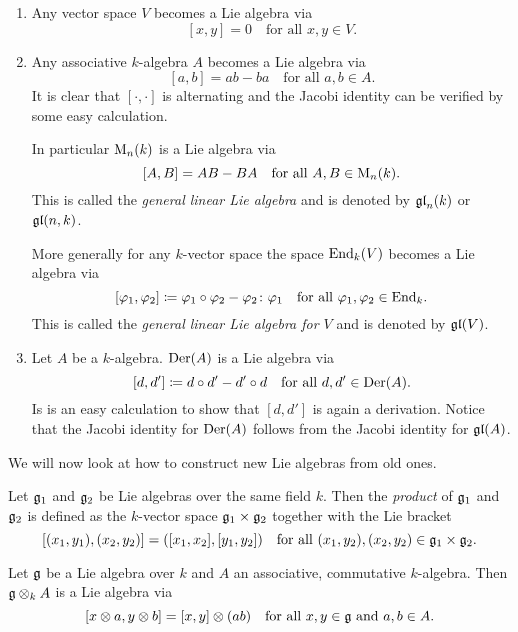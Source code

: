 \begin{expls}
 \begin{enumerate}
  \item
   Any vector space $V$ becomes a Lie algebra via
   \[
    [x,y] = 0 \quad \text{for all $x,y \in V$}.
   \]
  \item
   Any associative $k$-algebra $A$ becomes a Lie algebra via
   \[
    [a,b] = ab-ba \quad \text{for all $a,b \in A$}.
   \]
   It is clear that $[\cdot, \cdot]$ is alternating and the Jacobi identity can be verified by some easy calculation.
   
   In particular $\operatorname{M}_n(k)$ is a Lie algebra via
   \[
    [A,B] = AB-BA \quad \text{for all $A,B \in \operatorname{M}_n(k)$}.
   \]
   This is called the \emph{general linear Lie algebra} and is denoted by $\mathfrak{gl}_n(k)$ or $\mathfrak{gl}(n,k)$.
   
   More generally for any $k$-vector space the space $\operatorname{End}_k(V)$ becomes a Lie algebra via
   \[
    [\varphi_1, \varphi_2] \coloneqq \varphi_1 \circ \varphi_2 - \varphi_2 \colon \varphi_1
    \quad
    \text{for all $\varphi_1, \varphi_2 \in \operatorname{End}_k$}.
   \]
   This is called the \emph{general linear Lie algebra for $V$} and is denoted by $\mathfrak{gl}(V)$.
  \item
   Let $A$ be a $k$-algebra. $\operatorname{Der}(A)$ is a Lie algebra via
   \[
    [d, d'] \coloneqq d \circ d' - d' \circ d
    \quad 
    \text{for all $d, d' \in \operatorname{Der}(A)$}.
   \]
   Is is an easy calculation to show that $[d,d']$ is again a derivation. Notice that the Jacobi identity for $\operatorname{Der}(A)$ follows from the Jacobi identity for $\mathfrak{gl}(A)$.
 \end{enumerate}
\end{expls}


We will now look at how to construct new Lie algebras from old ones.


\begin{defi}
 Let $\mathfrak{g}_1$ and $\mathfrak{g}_2$ be Lie algebras over the same field $k$. Then the \emph{product} of $\mathfrak{g}_1$ and $\mathfrak{g}_2$ is defined as the $k$-vector space $\mathfrak{g}_1 \times \mathfrak{g}_2$ together with the Lie bracket
 \[
  [(x_1, y_1), (x_2, y_2)]
  = ([x_1, x_2], [y_1, y_2])
  \quad
  \text{for all $(x_1, y_2), (x_2, y_2) \in \mathfrak{g}_1 \times \mathfrak{g}_2$}.
 \]
\end{defi}


Let $\mathfrak{g}$ be a Lie algebra over $k$ and $A$ an associative, commutative $k$-algebra. Then $\mathfrak{g} \otimes_k A$ is a Lie algebra via
\[
 [x \otimes a, y \otimes b] = [x,y] \otimes (ab)
 \quad
 \text{for all $x,y \in \mathfrak{g}$ and $a,b \in A$}.
\]


